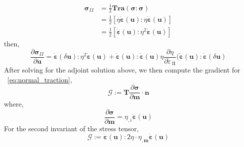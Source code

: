 \documentclass[12pt]{article}
\newcommand{\IIinv}{{\dot\varepsilon}_{\mathrm{\!\!\:II}}}
\newcommand{\mm}{{\ensuremath{\boldsymbol{m}}}}
\newcommand{\uu}{{\ensuremath{\boldsymbol{u}}}}
\newcommand{\ssigma}{{\ensuremath{\boldsymbol{\sigma}}}}
\newcommand{\strain}{{\ensuremath{\dot{\boldsymbol{\varepsilon}}}}}
\begin{document}
\begin{equation}
  \begin{split}
 \ssigma_{II}& = \frac{1}{2}\textbf{Tra}(\ssigma:\ssigma) \\
 & = \frac{1}{2}[\eta\strain(\uu):\eta\strain(\uu)]\\
             & = \frac{1}{2}[\strain(\uu):\eta^2\strain(\uu)]
\end{split}
\end{equation}
then,
\begin{equation}
    \frac{\partial \ssigma_{II}}{\partial \uu} = \strain(\delta \uu):\eta^2\strain(\uu) +
 \strain(\uu):\strain(\uu)\eta\frac{\partial\eta}{\partial \IIinv}(\strain(\uu):\strain(\delta\uu)
\end{equation}
After solving for the adjoint solution above, we then compute the gradient for ~\eqref{eq:normal_traction},
\begin{equation}
\mathcal{G}:=  \textbf{T}\frac{\partial{\ssigma}}{{\partial \mm}}\cdot \textbf{n}
\end{equation}
where,
\begin{equation}
\frac{\partial \ssigma}{\partial \mm} = \eta_{,i}\strain(\uu)
\end{equation}
For the second invariant of the stress tensor, 
\begin{equation}
\mathcal G:=  \strain(\uu):2\eta\cdot\eta_{,\mm}\strain(\uu)
\end{equation}
\end{document}
